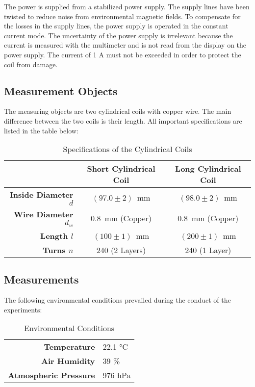 The power is supplied from a stabilized power supply. The supply lines have been twisted to reduce noise from environmental magnetic fields. To compensate for the losses in the supply lines, the power supply is operated in the constant current mode. The uncertainty of the power supply is irrelevant because the current is measured with the multimeter and is not read from the display on the power supply. The current of 1 A must not be exceeded in order to protect the coil from damage.

\subsection{Measurement Objects}
\label{subsec:measurement_objects}
The measuring objects are two cylindrical coils with copper wire. The main difference between the two coils is their length. All important specifications are listed in the table below:

\begin{table}[H]
	\centering
	\renewcommand{\arraystretch}{1.2}
	\begin{tabular}{r|c|c}
		 & \textbf{Short Cylindrical Coil} & \textbf{Long Cylindrical Coil} \\
		\hline
		\textbf{Inside Diameter $d$} & $(97.0\pm2)$\ mm & $(98.0\pm2)$\ mm \\
		\textbf{Wire Diameter $d_w$} & $0.8$\ mm (Copper) & $0.8$\ mm (Copper) \\
		\textbf{Length $l$} & $(100\pm1)$\ mm & $(200\pm1)$\ mm \\
		\textbf{Turns $n$} & 240 (2 Layers) & 240 (1 Layer) \\ \hline
	\end{tabular}
	\caption{Specifications of the Cylindrical Coils}
	\label{tab:Specifications_Cylindrical_Coils}
\end{table}

\subsection{Measurements}
\label{subsec:Measurements}
The following environmental conditions prevailed during the conduct of the experiments:
\begin{table}[H]
	\centering
	\renewcommand{\arraystretch}{1.2}
	\begin{tabular}{r l}
		\hline
		\textbf{Temperature} & 22.1 °C \\
		\textbf{Air Humidity} & 39 \% \\
		\textbf{Atmospheric Pressure} & 976 hPa \\ \hline
	\end{tabular}
	\caption{Environmental Conditions}
	\label{tab:Environmental_Conditions}
\end{table}
